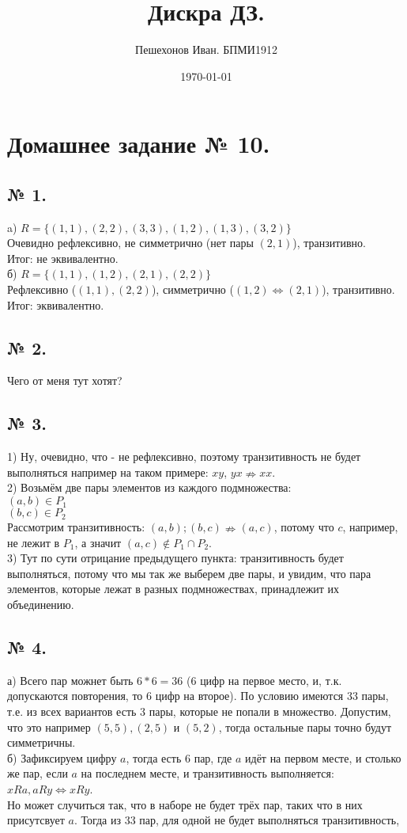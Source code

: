 \documentclass[a4paper,11pt]{report}
\title{Дискра ДЗ.}
\author{Пешехонов Иван. БПМИ1912}
\date{\today}
\begin{document}
\chapter{Домашнее задание № 10.}
\section{№ 1.}
a) $R = \{(1, 1), (2, 2), (3, 3), (1, 2), (1, 3), (3, 2)\}$\\
Очевидно рефлексивно, не симметрично (нет пары $(2, 1)$), транзитивно.\\
Итог: не эквивалентно.\\
б) $R = \{(1, 1), (1, 2), (2, 1), (2, 2)\}$\\
Рефлексивно ($(1, 1), (2, 2)$), симметрично ($(1, 2) \Leftrightarrow (2, 1)$), транзитивно.\\
Итог: эквивалентно.
\section{№ 2.}
Чего от меня тут хотят?
\section{№ 3.}
1) Ну, очевидно, что  - не рефлексивно, поэтому транзитивность не будет выполняться например на таком
примере: $x$$y$, $y$$x \nRightarrow x$$x$.\\
2) Возьмём две пары элементов из каждого подмножества:\\
$(a, b) \in P_1$\\
$(b, c) \in P_2$\\
Рассмотрим транзитивность: $(a, b);(b, c) \nRightarrow (a, c)$, потому что $c$, например, не лежит в $P_1$, а значит
$(a, c) \notin P_1 \cap P_2$.\\
3) Тут по сути отрицание предыдущего пункта: транзитивность будет выполняться, потому что мы так же выберем две
пары, и увидим, что пара элементов, которые лежат в разных подмножествах, принадлежит их объединению.\\
\section{№ 4.}
а) Всего пар можнет быть $6 * 6 = 36$ (6 цифр на первое место, и, т.к. допускаются повторения, то 6 цифр на второе).
По условию имеются 33 пары, т.е. из всех вариантов есть 3 пары, которые не попали в множество. Допустим, что это
например $(5, 5), (2, 5)$ и $(5, 2)$, тогда остальные пары точно будут симметричны.\\
б) Зафиксируем цифру $a$, тогда есть 6 пар, где $a$ идёт на первом месте, и столько же пар, если $a$ на последнем месте,
и транзитивность выполняется: $xRa, aRy \Leftrightarrow xRy$.\\ 
Но может случиться так, что в наборе не будет трёх пар, таких что в них присутсвует $a$. Тогда из 33 пар, для одной
не будет выполняться транзитивность,\\
\end{document}
